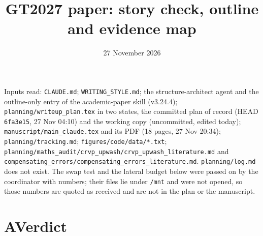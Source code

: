 \documentclass[10pt]{article}
\title{GT2027 paper: story check, outline and evidence map}
\author{}
\date{27 November 2026}
\begin{document}
\maketitle
\vspace{-12mm}

{\small Inputs read: \texttt{CLAUDE.md}; \texttt{WRITING\_STYLE.md}; the structure-architect agent and the
outline-only entry of the academic-paper skill (v3.24.4); \texttt{planning/writeup\_plan.tex} in two states, the
committed plan of record (HEAD \texttt{6fa3e15}, 27 Nov 04:10) and the working copy (uncommitted, edited today);
\texttt{manuscript/main\_claude.tex} and its PDF (18 pages, 27 Nov 20:34); \texttt{planning/tracking.md};
\texttt{figures/code/data/*.txt}; \texttt{planning/maths\_audit/crvp\_upwash/crvp\_upwash\_literature.md} and
\texttt{compensating\_errors/compensating\_errors\_literature.md}. \texttt{planning/log.md} does not exist.
The swap test and the lateral budget below were passed on by the coordinator with numbers; their files lie under
\texttt{/mnt} and were not opened, so those numbers are quoted as received and are not in the plan or the
manuscript.}

\section*{A\quad Verdict}
\end{document}
